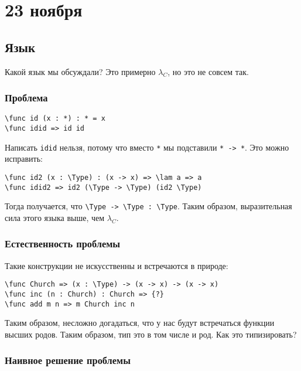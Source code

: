 \chapter{23 ноября}

\section{Язык}

Какой язык мы обсуждали? Это примерно \(\lambda_C\), но это не совсем так.

\subsection{Проблема}

\begin{example}\itemfix
    \begin{verbatim}
\func id (x : *) : * = x
\func idid => id id  
    \end{verbatim}
    Написать \texttt{idid} нельзя, потому что вместо \texttt{*} мы подставили \texttt{* -> *}. Это можно исправить:
    \begin{verbatim}
\func id2 (x : \Type) : (x -> x) => \lam a => a
\func idid2 => id2 (\Type -> \Type) (id2 \Type)
    \end{verbatim}
    Тогда получается, что \texttt{\textbackslash{}Type -> \textbackslash{}Type : \textbackslash{}Type}. Таким образом, выразительная сила этого языка выше, чем \(\lambda_C\).
\end{example}

\subsection{Естественность проблемы}

Такие конструкции не искусственны и встречаются в природе:
\begin{example}\itemfix
    \begin{verbatim}
\func Church => (x : \Type) -> (x -> x) -> (x -> x)
\func inc (n : Church) : Church => {?}
\func add m n => m Church inc n
    \end{verbatim}
\end{example}

Таким образом, несложно догадаться, что у нас будут встречаться функции высших родов. Таким образом, тип это в том числе и род. Как это типизировать?

\subsection{Наивное решение проблемы}

